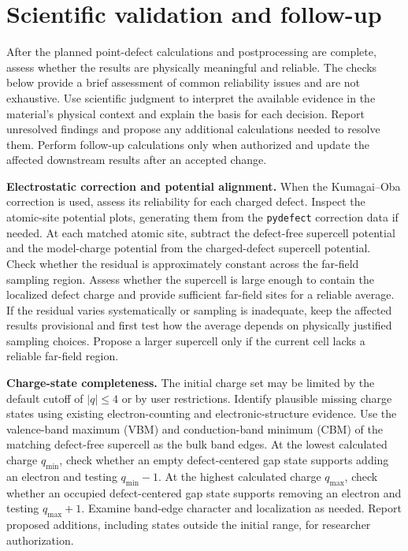\documentclass[aps,prmaterials,reprint,superscriptaddress]{revtex4-2}
\begin{document}
\section{Scientific validation and follow-up}

After the planned point-defect calculations and postprocessing are complete, assess whether the results are physically meaningful and reliable. The checks below provide a brief assessment of common reliability issues and are not exhaustive. Use scientific judgment to interpret the available evidence in the material's physical context and explain the basis for each decision. Report unresolved findings and propose any additional calculations needed to resolve them. Perform follow-up calculations only when authorized and update the affected downstream results after an accepted change.

\textbf{Electrostatic correction and potential alignment.}
When the Kumagai--Oba correction \cite{Kumagai2014} is used, assess its reliability for each charged defect. Inspect the atomic-site potential plots, generating them from the \texttt{pydefect} \cite{Kumagai2021} correction data if needed. At each matched atomic site, subtract the defect-free supercell potential and the model-charge potential from the charged-defect supercell potential. Check whether the residual is approximately constant across the far-field sampling region. Assess whether the supercell is large enough to contain the localized defect charge and provide sufficient far-field sites for a reliable average. If the residual varies systematically or sampling is inadequate, keep the affected results provisional and first test how the average depends on physically justified sampling choices. Propose a larger supercell only if the current cell lacks a reliable far-field region.

\textbf{Charge-state completeness.}
The initial charge set may be limited by the default cutoff of $|q|\leq4$ or by user restrictions. Identify plausible missing charge states using existing electron-counting and electronic-structure evidence. Use the valence-band maximum (VBM) and conduction-band minimum (CBM) of the matching defect-free supercell as the bulk band edges. At the lowest calculated charge $q_{\min}$, check whether an empty defect-centered gap state supports adding an electron and testing $q_{\min}-1$. At the highest calculated charge $q_{\max}$, check whether an occupied defect-centered gap state supports removing an electron and testing $q_{\max}+1$. Examine band-edge character and localization as needed. Report proposed additions, including states outside the initial range, for researcher authorization.
\end{document}
